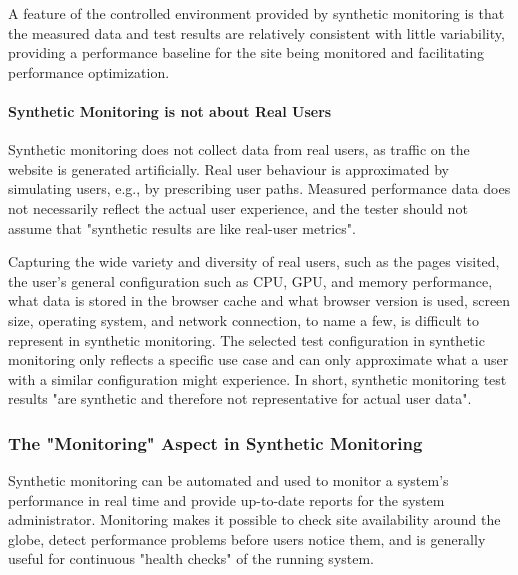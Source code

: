 A feature of the controlled environment provided by synthetic monitoring is that the measured data and test results are relatively consistent with little variability, providing a performance baseline for the site being monitored and facilitating performance optimization. %


\paragraph{Synthetic Monitoring is not about Real Users} %


Synthetic monitoring does not collect data from real users, as traffic on the website is generated artificially.
Real user behaviour is approximated by simulating users, e.g., by prescribing user paths.
Measured performance data does not necessarily reflect the actual user experience, and the tester should not assume that "synthetic results are like real-user metrics". %

Capturing the wide variety and diversity of real users, such as the pages visited, the user's general configuration such as CPU, GPU, and memory performance, what data is stored in the browser cache and what browser version is used, screen size, operating system, and network connection, to name a few, is difficult to represent in synthetic monitoring. %
The selected test configuration in synthetic monitoring only reflects a specific use case and can only approximate what a user with a similar configuration might experience. %
In short, synthetic monitoring test results "are synthetic and therefore not representative for actual user data".  %


\subsubsection{The "Monitoring" Aspect in Synthetic Monitoring} %

Synthetic monitoring can be automated and used to monitor a system's performance in real time and provide up-to-date reports for the system administrator. %
Monitoring makes it possible to check site availability around the globe, %
detect performance problems before users notice them, %
and is generally useful for continuous "health checks" of the running system.  %

